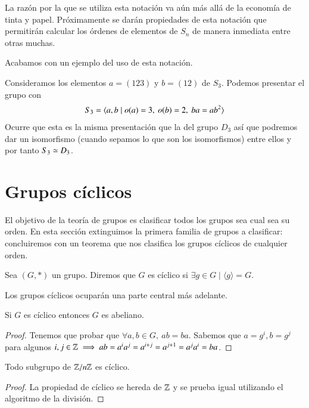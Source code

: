 La razón por la que se utiliza esta notación va aún más allá de la economía de tinta y papel. Próximamente se darán propiedades de esta notación que permitirán calcular los órdenes de elementos de $S_n$ de manera inmediata entre otras muchas.


Acabamos con un ejemplo del uso de esta notación.

\begin{ej}
	Consideramos los elementos $a = (123)$ y $b = (12)$ de $S_3$. Podemos presentar el grupo con
	\begin{align*}
		S_3 = \langle a, b \mid o(a) = 3,\ o(b) = 2,\ ba = ab^2\rangle
	\end{align*}
	Ocurre que esta es la misma presentación que la del grupo $D_3$ así que podremos dar un isomorfismo (cuando sepamos lo que son los isomorfismos) entre ellos y por tanto $S_3 \simeq D_3$.
\end{ej}


\section{Grupos cíclicos}

El objetivo de la teoría de grupos es clasificar todos los grupos sea cual sea su orden. En esta sección extinguimos la primera familia de grupos a clasificar: concluiremos con un teorema que nos clasifica los grupos cíclicos de cualquier orden.

\begin{dfn}
	Sea $(G, \ast)$ un grupo. Diremos que $G$ es cíclico si $\exists g \in G \mid \langle g \rangle = G$.
\end{dfn}

Los grupos cíclicos ocuparán una parte central más adelante.

\begin{thm}
	\label{thm:ciclicoimplicaabeliano}
	Si $G$ es cíclico entonces $G$ es abeliano.
\end{thm}

\begin{proof}
	Tenemos que probar que $\forall a,b \in G,\ ab = ba$. Sabemos que $a = g^i, b = g^j$ para algunos $i, j \in \mathbb{Z} \implies ab = a^i a^j = a^{i+j} = a^{j+1} = a^j a^i = ba$.
\end{proof}


\begin{pro}
	Todo subgrupo de $\mathbb{Z}/n\mathbb{Z}$ es cíclico.
\end{pro}

\begin{proof}
	La propiedad de cíclico se hereda de $\mathbb{Z}$ y se prueba igual utilizando el algoritmo de la división. %
\end{proof}

